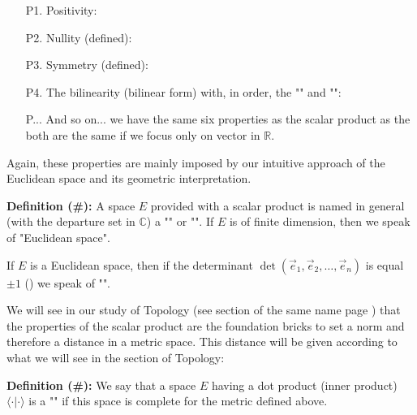 	\begin{enumerate}
		\item[P1.] Positivity: 
		
	  	
	  	\item[P2.] Nullity (defined): 
	  	 
	  	
	  	\item[P3.] Symmetry (defined): 
	  	
	  	
	  	\item[P4.] The bilinearity (bilinear form) with, in order, the "" and "":
	  	
		
		\item[P...] And so on... we have the same six properties as the scalar product as the both are the same if we focus only on vector in $\mathbb{R}$.
	\end{enumerate}
	\begin{tcolorbox}[title=Remark,colframe=black,arc=10pt]
	Again, these properties are mainly imposed by our intuitive approach of the Euclidean space and its geometric interpretation.
	\end{tcolorbox}	
	
	\textbf{Definition (\#\mydef):} A space $E$ provided with a scalar product is named in general (with the departure set in $\mathbb{C}$) a "" or "". If $E$ is of finite dimension, then we speak of "Euclidean space".
	\begin{tcolorbox}[title=Remark,colframe=black,arc=10pt]
	If $E$ is a Euclidean space, then if the determinant $\det(\vec{e}_1,\vec{e}_2,\ldots,\vec{e}_n)$ is equal $\pm 1$ () we speak of "\label{oriented Euclidean space}".
	\end{tcolorbox}	
	
	We will see in our study of Topology (see section of the same name page \pageref{topology}) that the properties of the scalar product are the foundation bricks to set a norm and therefore a distance in a metric space. This distance will be given according to what we will see in the section of Topology:
	
	
	\textbf{Definition (\#\mydef):} We say that a space $E$ having a dot product (inner product) $ \langle \cdot | \cdot \rangle$ is a "" if this space is complete for the metric defined above.
	
